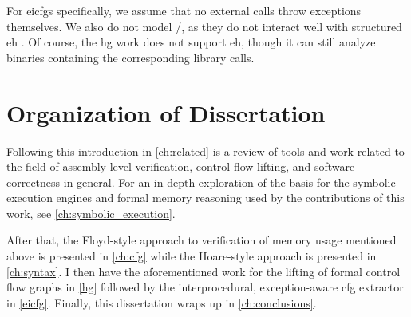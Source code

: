 For \acp{eicfg} specifically, we assume that no external calls throw exceptions themselves.
We also do not model /, as they do not interact well with structured \ac{eh} \autocite{using-setjmp-and-longjmp}.
Of course, the \ac{hg} work does not support \ac{eh}, though it can still analyze binaries containing the corresponding library calls.


\section{Organization of Dissertation}
Following this introduction in \cref{ch:related} is a review of tools and work related to the field of assembly-level verification, control flow lifting, and software correctness in general.
For an in-depth exploration of the basis for the symbolic execution engines and formal memory reasoning used by the contributions of this work,
see \cref{ch:symbolic_execution}.

After that, the Floyd-style approach to verification of memory usage mentioned above is presented in \cref{ch:cfg} while the Hoare-style approach is presented in \cref{ch:syntax}.
I then have the aforementioned work for the lifting of formal control flow graphs in \cref{hg}
followed by the interprocedural, exception-aware \ac{cfg} extractor in \cref{eicfg}.
Finally, this dissertation wraps up in \cref{ch:conclusions}.
